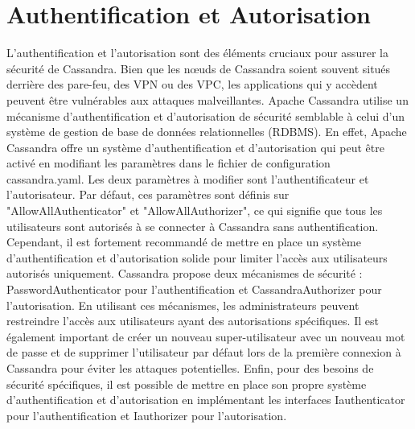 \documentclass[12pt, letterpaper]{report}
\begin{document}
\section{Authentification et Autorisation}
L'authentification et l'autorisation sont des éléments cruciaux pour assurer la sécurité de Cassandra. Bien que les nœuds de Cassandra soient souvent situés derrière des pare-feu, des VPN ou des VPC, les applications qui y accèdent peuvent être vulnérables aux attaques malveillantes.
\newline
Apache Cassandra utilise un mécanisme d'authentification et d'autorisation de sécurité semblable à celui d'un système de gestion de base de données relationnelles (RDBMS). En effet, Apache Cassandra offre un système d'authentification et d'autorisation qui peut être activé en modifiant les paramètres dans le fichier de configuration cassandra.yaml. Les deux paramètres à modifier sont l'authentificateur et l'autorisateur. Par défaut, ces paramètres sont définis sur "AllowAllAuthenticator" et "AllowAllAuthorizer", ce qui signifie que tous les utilisateurs sont autorisés à se connecter à Cassandra sans authentification.
\newline
Cependant, il est fortement recommandé de mettre en place un système d'authentification et d'autorisation solide pour limiter l'accès aux utilisateurs autorisés uniquement. Cassandra propose deux mécanismes de sécurité : PasswordAuthenticator pour l'authentification et CassandraAuthorizer pour l'autorisation. En utilisant ces mécanismes, les administrateurs peuvent restreindre l'accès aux utilisateurs ayant des autorisations spécifiques.
\newline
Il est également important de créer un nouveau super-utilisateur avec un nouveau mot de passe et de supprimer l'utilisateur par défaut lors de la première connexion à Cassandra pour éviter les attaques potentielles. Enfin, pour des besoins de sécurité spécifiques, il est possible de mettre en place son propre système d'authentification et d'autorisation en implémentant les interfaces Iauthenticator pour l'authentification et Iauthorizer pour l'autorisation.
\end{document}
